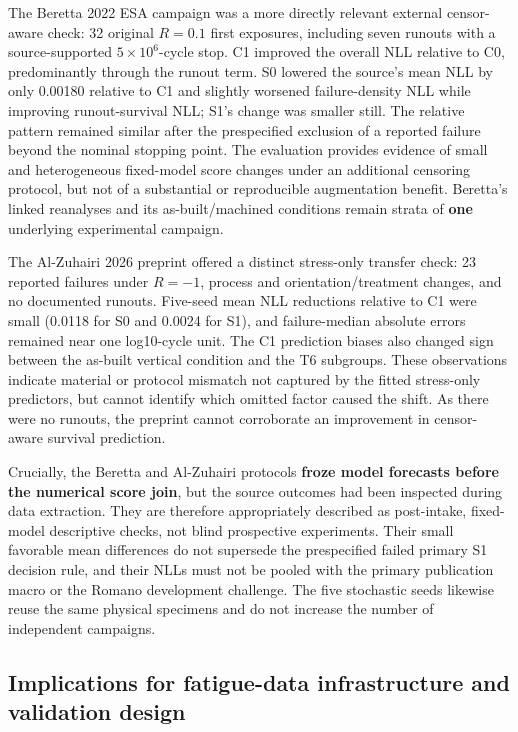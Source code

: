 \documentclass[12pt,a4paper]{article}
\begin{document}
The Beretta 2022 ESA campaign was a more directly relevant external censor-aware check: 32 original \(R=0.1\) first exposures, including seven runouts with a source-supported \(5\times10^6\)-cycle stop. C1 improved the overall NLL relative to C0, predominantly through the runout term. S0 lowered the source's mean NLL by only 0.00180 relative to C1 and slightly worsened failure-density NLL while improving runout-survival NLL; S1's change was smaller still. The relative pattern remained similar after the prespecified exclusion of a reported failure beyond the nominal stopping point. The evaluation provides evidence of small and heterogeneous fixed-model score changes under an additional censoring protocol, but not of a substantial or reproducible augmentation benefit. Beretta's linked reanalyses and its as-built/machined conditions remain strata of \textbf{one} underlying experimental campaign.

The Al-Zuhairi 2026 preprint offered a distinct stress-only transfer check: 23 reported failures under \(R=-1\), process and orientation/treatment changes, and no documented runouts. Five-seed mean NLL reductions relative to C1 were small (0.0118 for S0 and 0.0024 for S1), and failure-median absolute errors remained near one log10-cycle unit. The C1 prediction biases also changed sign between the as-built vertical condition and the T6 subgroups. These observations indicate material or protocol mismatch not captured by the fitted stress-only predictors, but cannot identify which omitted factor caused the shift. As there were no runouts, the preprint cannot corroborate an improvement in censor-aware survival prediction.

Crucially, the Beretta and Al-Zuhairi protocols \textbf{froze model forecasts before the numerical score join}, but the source outcomes had been inspected during data extraction. They are therefore appropriately described as post-intake, fixed-model descriptive checks, not blind prospective experiments. Their small favorable mean differences do not supersede the prespecified failed primary S1 decision rule, and their NLLs must not be pooled with the primary publication macro or the Romano development challenge. The five stochastic seeds likewise reuse the same physical specimens and do not increase the number of independent campaigns.

\subsection{Implications for fatigue-data infrastructure and validation design}
\end{document}
